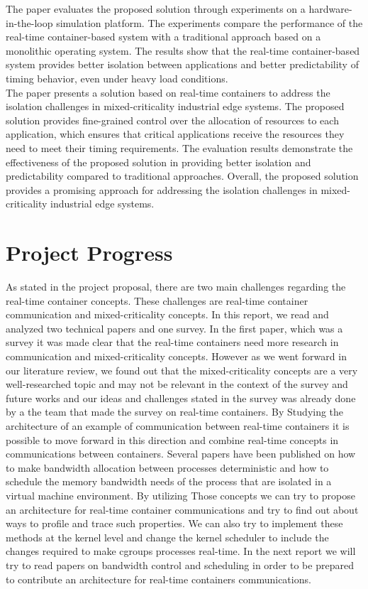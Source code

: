 \documentclass[a4paper, 10pt]{article}
\theoremstyle{nonumberplain}
\begin{document}
The paper evaluates the proposed solution through experiments on a hardware-
in-the-loop simulation platform. The experiments compare the performance of
the real-time container-based system with a traditional approach based on a
monolithic operating system. The results show that the real-time container-based
system provides better isolation between applications and better predictability of
timing behavior, even under heavy load conditions. \\
The paper presents a solution based on real-time containers to address the
isolation challenges in mixed-criticality industrial edge systems. The proposed
solution provides fine-grained control over the allocation of resources to each
application, which ensures that critical applications receive the resources they
need to meet their timing requirements. The evaluation results demonstrate the
effectiveness of the proposed solution in providing better isolation and
predictability compared to traditional approaches. Overall, the proposed solution
provides a promising approach for addressing the isolation challenges in mixed-
criticality industrial edge systems.

\section{Project Progress}
As stated in the project proposal, there are two main challenges regarding
the real-time container concepts. These challenges are real-time 
container communication and mixed-criticality concepts.
In this report, we read and analyzed two technical papers and one survey.
In the first paper, which was a survey it was made clear that the real-time
containers need more research in communication and mixed-criticality concepts.
However as we went forward in our literature review, we found out that
the mixed-criticality concepts are a very well-researched topic and may not
be relevant in the context of the survey and future works and our ideas and
challenges stated in the survey was already done by a the team that made the
survey on real-time containers.
By Studying the architecture of an example of communication between real-time
containers it is possible to move forward in this direction and combine
real-time concepts in communications between containers.
Several papers have been published on how to make bandwidth allocation between
processes deterministic and how to schedule the memory bandwidth needs of the
process that are isolated in a virtual machine environment. By utilizing
Those concepts we can try to propose an architecture for real-time container
communications and try to find out about ways to profile and trace such
properties. We can also try to implement these methods at the kernel level
and change the kernel scheduler to include the changes required to make cgroups
processes real-time. In the next report we will try to read papers on
bandwidth control and scheduling in order to be prepared to contribute an
architecture for real-time containers communications.
\end{document}
